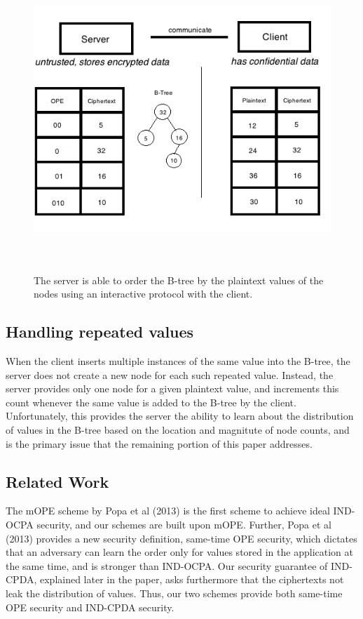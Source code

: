 \documentclass[12pt]{article}
\begin{document}
\begin{figure}[htb]
\begin{center}
\includegraphics[height=4.5in,width=6in,angle=0]{857pic5.png}
\caption{The server is able to order the B-tree by the plaintext values of the nodes using an interactive protocol with the client.}
\end{center}
\end{figure}

\subsection{Handling repeated values}

When the client inserts multiple instances of the same value into the B-tree, the server does not create a new node for each such repeated value. Instead, the server provides only one node for a given plaintext value, and increments this count whenever the same value is added to the B-tree by the client. Unfortunately, this provides the server the ability to learn about the distribution of values in the B-tree based on the location and magnitute of node counts, and is the primary issue that the remaining portion of this paper addresses. 

\subsection{Related Work}

The mOPE scheme by Popa et al (2013) is the first scheme to achieve ideal IND-OCPA security, and our schemes are built upon mOPE. Further, Popa et al (2013) provides a new security definition, same-time OPE security, which dictates that an adversary can learn the order only for values stored in the application at the same time, and is stronger than IND-OCPA. Our security guarantee of IND-CPDA, explained later in the paper, asks furthermore that the ciphertexts not leak the distribution of values. Thus, our two schemes provide both same-time OPE security and IND-CPDA security.
\end{document}
